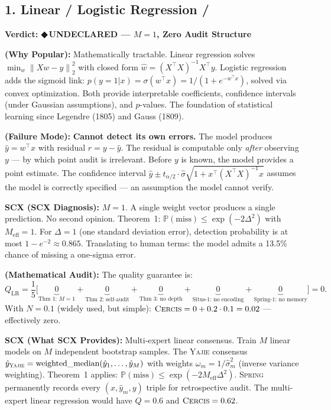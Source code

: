 \documentclass[12pt,a4paper]{article}
\theoremstyle{definition}
\newcommand{\guilty}{{\color{guiltycolor}\textbf{◆\,UNDECLARED}}}
\newcommand{\Yajie}{\textsc{Yajie}}
\newcommand{\Spring}{\textsc{Spring}}
\newcommand{\Cercis}{\textsc{Cercis}}
\newcommand{\Pbb}{\mathbb{P}}
\newcommand{\norm}[1]{\left\lVert#1\right\rVert}
\newcommand{\auditHeader}[1]{\medskip\noindent\textbf{\large #1}\medskip}
\newcommand{\whyPopular}{\noindent\textbf{ (Why Popular):} }
\newcommand{\whyFail}{\noindent\textbf{ (Failure Mode):} }
\newcommand{\whatMissing}{\noindent\textbf{SCX (What SCX Provides):} }
\newcommand{\diagnosis}{\noindent\textbf{SCX (SCX Diagnosis):} }
\newcommand{\mathAudit}{\noindent\textbf{ (Mathematical Audit):} }
\begin{document}
\subsection{1. Linear / Logistic Regression /}

\auditHeader{Verdict: \guilty{} — $M=1$, Zero Audit Structure}

\whyPopular{} Mathematically tractable. Linear regression solves $\min_w \norm{Xw - y}_2^2$ with closed form $\hat{w} = (X^\top X)^{-1}X^\top y$. Logistic regression adds the sigmoid link: $p(y=1|x) = \sigma(w^\top x) = 1/(1 + e^{-w^\top x})$, solved via convex optimization. Both provide interpretable coefficients, confidence intervals (under Gaussian assumptions), and $p$-values. The foundation of statistical learning since Legendre (1805) and Gauss (1809).

\whyFail{} \textbf{Cannot detect its own errors.} The model produces $\hat{y} = w^\top x$ with residual $r = y - \hat{y}$. The residual is computable only \textit{after} observing $y$ — by which point audit is irrelevant. Before $y$ is known, the model provides a point estimate. The confidence interval $\hat{y} \pm t_{\alpha/2} \cdot \hat{\sigma}\sqrt{1 + x^\top(X^\top X)^{-1}x}$ assumes the model is correctly specified — an assumption the model cannot verify.

\diagnosis{} $M=1$. A single weight vector produces a single prediction. No second opinion. Theorem~1: $\Pbb(\text{miss}) \le \exp(-2\Delta^2)$ with $M_{\text{eff}}=1$. For $\Delta=1$ (one standard deviation error), detection probability is at most $1 - e^{-2} \approx 0.865$. Translating to human terms: the model admits a 13.5\% chance of missing a one-sigma error.

\mathAudit{} The quality guarantee is:
\begin{equation}\label{eq:linreg_Q}
    Q_{\text{LR}} = \frac{1}{5}\bigl[\underbrace{0}_{\text{Thm 1: } M=1} + \underbrace{0}_{\text{Thm 2: self-audit}} + \underbrace{0}_{\text{Thm 3: no depth}} + \underbrace{0}_{\text{Situs-1: no encoding}} + \underbrace{0}_{\text{Spring-1: no memory}}\bigr] = 0.
\end{equation}
With $N=0.1$ (widely used, but simple): $\Cercis = 0 + 0.2 \cdot 0.1 = 0.02$ — effectively zero.

\whatMissing{} Multi-expert linear consensus. Train $M$ linear models on $M$ independent bootstrap samples. The \Yajie{} consensus $\hat{y}_{\Yajie} = \text{weighted\_median}(\hat{y}_1, \ldots, \hat{y}_M)$ with weights $\omega_m = 1/\hat{\sigma}_m^2$ (inverse variance weighting). Theorem~1 applies: $\Pbb(\text{miss}) \le \exp(-2M_{\text{eff}}\Delta^2)$. \Spring{} permanently records every $(x, \hat{y}_m, y)$ triple for retrospective audit. The multi-expert linear regression would have $Q = 0.6$ and $\Cercis = 0.62$.
\end{document}
